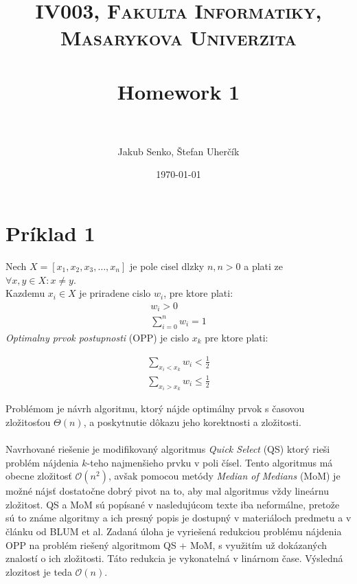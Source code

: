 \documentclass[paper=a4, fontsize=11pt]{scrartcl} %
\title{	
\normalfont \normalsize 
\textsc{IV003, Fakulta Informatiky, Masarykova Univerzita} \\ [25pt] %
\horrule{0.5pt} \\[0.4cm] %
\huge Homework 1 \\ %
\horrule{2pt} \\[0.5cm] %
}
\author{Jakub Senko, Štefan Uherčík} %
\date{\normalsize\today} %
\numberwithin{equation}{section} %
\numberwithin{figure}{section} %
\numberwithin{table}{section} %
\begin{document}
\maketitle %


\section*{Príklad 1}

Nech $X = [x_1, x_2, x_3, \dots, x_n]$ je pole cisel dlzky $n, n > 0$ a plati ze $\forall x,y \in X: x \neq y$. \\
Kazdemu $x_i \in X$ je priradene cislo $w_i$, pre ktore plati:
\begin{equation}
    \begin{aligned}
        w_i > 0 \\
        \sum_{i = 0}^{n} w_i = 1
    \end{aligned}
\end{equation}
{\em Optimalny prvok postupnosti} (OPP) je cislo $x_k$ pre ktore plati:

\begin{equation}
    \begin{aligned}
        \sum_{x_i < x_k} w_i < \frac{1}{2} \\
        \sum_{x_i > x_k} w_i \leq \frac{1}{2}
    \end{aligned}
\end{equation}

Problémom je návrh algoritmu, ktorý nájde optimálny prvok s časovou zložitosťou $\Theta(n)$, a poskytnutie dôkazu jeho korektnosti a zložitosti. \\
\\
Navrhované riešenie je modifikovaný algoritmus {\em Quick Select} (QS) ktorý rieši problém nájdenia $k$-teho najmenšieho prvku v poli čísel. Tento algoritmus má obecne zložitosť $\mathcal{O}(n^2)$, avšak pomocou metódy {\em Median of Medians} (MoM) je možné nájsť dostatočne dobrý pivot na to, aby mal algoritmus vždy lineárnu zložitost.  QS a MoM sú popísané v nasledujúcom texte iba neformálne, pretože sú to známe algoritmy a ich presný popis je dostupný v materiáloch predmetu a v článku od BLUM et al. \cite{blum} Zadaná úloha  je vyriešená redukciou problému nájdenia OPP na problém riešený algoritmom QS + MoM, s využitím už dokázaných znalostí o ich zložitosti. Táto redukcia je vykonatelná v linárnom čase. Výsledná zlozitost je teda $\mathcal{O}(n)$. \\
\end{document}
